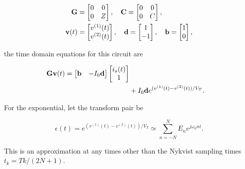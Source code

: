 \documentclass[12pt,journal,compsoc]{../ieeepaper/IEEEtran}
\begin{document}
\begin{equation}\label{eqn:ece1254projectReport:640}
\begin{aligned}
\BG &=
\begin{bmatrix}
0 & 0 \\
0 & Z \\
\end{bmatrix}, \quad
\BC =
\begin{bmatrix}
0 & 0 \\
0 & C \\
\end{bmatrix}, \\
\Bv(t) &=
\begin{bmatrix}
v^{(1)}(t) \\
v^{(2)}(t) \\
\end{bmatrix}, \quad
\Bd = 
\begin{bmatrix}
1 \\
-1
\end{bmatrix}, \quad
\Bb = 
\begin{bmatrix}
1 \\
0
\end{bmatrix},
\end{aligned}
\end{equation}

the time domain equations for this circuit are

\begin{equation}\label{eqn:ece1254projectReport:1320}
\begin{aligned}
\BG \Bv(t)
=
\begin{bmatrix}
\Bb & -I_0 \Bd
\end{bmatrix}
\begin{bmatrix}
i_s(t) \\
1
\end{bmatrix} \\
&+
I_0 \Bd
e^{ (v^{(1)}(t) - v^{(2)}(t))/V_T}.
\end{aligned}
\end{equation}

For the exponential, let the transform pair be

\begin{equation}\label{eqn:ece1254projectReport:1300}
\epsilon(t) = 
e^{ (v^{(1)}(t) - v^{(2)}(t))/V_T}
\simeq
\sum_{n=-N}^N E_n e^{ j \omega_0 n t }.
\end{equation}

This is an approximation at any times other than the Nykvist sampling times \( t_k = T k/(2 N + 1) \).
\end{document}
